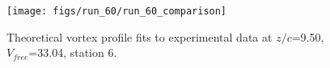 \begin{figure}[H]
\centering
\texttt{[image: figs/run\_60/run\_60\_comparison]}
\caption{Theoretical vortex profile fits to experimental data at $z/c$=9.50, $V_{free}$=33.04, station 6.}
\end{figure}


